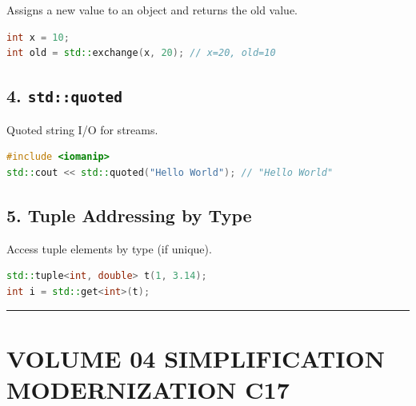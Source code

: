 Assigns a new value to an object and returns the old value.

\begin{lstlisting}[language={C++}]
int x = 10;
int old = std::exchange(x, 20); // x=20, old=10
\end{lstlisting}

\hypertarget{stdquoted}{%
\section{\texorpdfstring{4.
\texttt{std::quoted}}{4. std::quoted}}\label{stdquoted}}

Quoted string I/O for streams.

\begin{lstlisting}[language={C++}]
#include <iomanip>
std::cout << std::quoted("Hello World"); // "Hello World"
\end{lstlisting}

\hypertarget{tuple-addressing-by-type}{%
\section{5. Tuple Addressing by Type}\label{tuple-addressing-by-type}}

Access tuple elements by type (if unique).

\begin{lstlisting}[language={C++}]
std::tuple<int, double> t(1, 3.14);
int i = std::get<int>(t);
\end{lstlisting}

\begin{center}\rule{0.5\linewidth}{0.5pt}\end{center}

\hypertarget{volume-04-simplification-modernization-c17}{%
\chapter{VOLUME 04 SIMPLIFICATION MODERNIZATION
C17}\label{volume-04-simplification-modernization-c17}}
